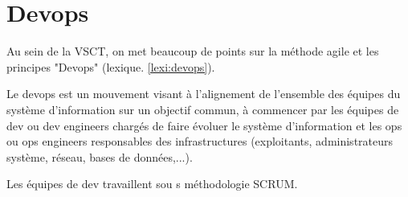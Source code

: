 \section{Devops}

Au sein de la VSCT, on met beaucoup de points sur la méthode agile et les principes "Devops" (lexique. \ref{lexi:devops}).

Le devops est un mouvement visant à l'alignement de l'ensemble des équipes du système d'information sur un objectif commun, à commencer par les équipes de dev ou dev engineers chargés de faire évoluer le système d'information et les ops ou ops engineers responsables des infrastructures
(exploitants, administrateurs système, réseau, bases de données,...).

Les équipes de dev travaillent sou s méthodologie SCRUM.
